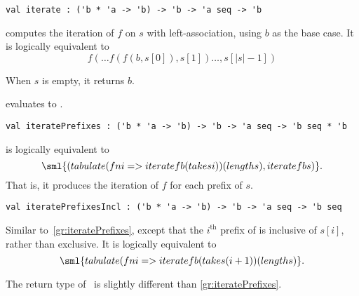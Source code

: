 \begin{flex}
\label{grp:grm:seq-interface::iterate}

\begin{gram}
\label{grm:seq-interface::iterate}
\begin{gram}[iterate]
\label{gr:iterate}
\begin{verbatim}
val iterate : ('b * 'a -> 'b) -> 'b -> 'a seq -> 'b
\end{verbatim}
 computes the iteration of $f$ on $s$ with left-association,
using $b$ as the base case. It is logically equivalent to
\[
  f(\ldots f(f(b, s[0]), s[1]) \ldots, s[|s|-1])
\]
\end{gram}
\begin{note}
When $s$ is empty, it returns $b$.
\end{note}
\begin{example}
 evaluates to .
\end{example}

\end{gram}
\end{flex}

\begin{cluster}
\label{grp:gr:iteratePrefixes}

\begin{gram}[iteratePrefixes]
\label{gr:iteratePrefixes}
\begin{verbatim}
val iteratePrefixes : ('b * 'a -> 'b) -> 'b -> 'a seq -> 'b seq * 'b
\end{verbatim}
 is logically equivalent to
\[
  \sml{(tabulate (fn i => iterate f b (take s i)) (length s), iterate f b s)}.
\]
That is, it produces the iteration of $f$ for each prefix of $s$.

\end{gram}
\end{cluster}

\begin{flex}
\label{grp:grm:seq-interface::iterateprefixesincl}

\begin{gram}
\label{grm:seq-interface::iterateprefixesincl}
\begin{gram}[iteratePrefixesIncl]
\label{gr:iteratePrefixesIncl}
\begin{verbatim}
val iteratePrefixesIncl : ('b * 'a -> 'b) -> 'b -> 'a seq -> 'b seq
\end{verbatim}
Similar to~\ref{gr:iteratePrefixes}, except that the $i^\text{th}$ prefix of
 is inclusive of $s[i]$, rather than exclusive.
It is logically equivalent to
\[
  \sml{tabulate (fn i => iterate f b (take s (i+1)) (length s)}.
\]
\end{gram}
\begin{note}
The return type of~ is slightly different than
\ref{gr:iteratePrefixes}.
\end{note}

\end{gram}
\end{flex}

